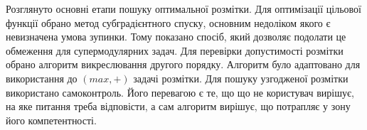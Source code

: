 \chapterConclusion

Розглянуто основні етапи пошуку оптимальної розмітки.
Для оптимізації цільової функції обрано метод субградієнтного спуску, основним недоліком
якого є невизначена умова зупинки. Тому показано спосіб, який дозволяє подолати це обмеження для супермодулярних задач.
Для перевірки допустимості розмітки обрано алгоритм викреслювання другого порядку. Алгоритм було адаптовано
для використання до $(max,+)$ задачі розмітки. Для пошуку узгодженої розмітки використано самоконтроль. Його перевагою є те, 
що що не користувач вирішує, на яке питання треба відповісти, а сам алгоритм вирішує, що потрапляє у
зону його компетентності.